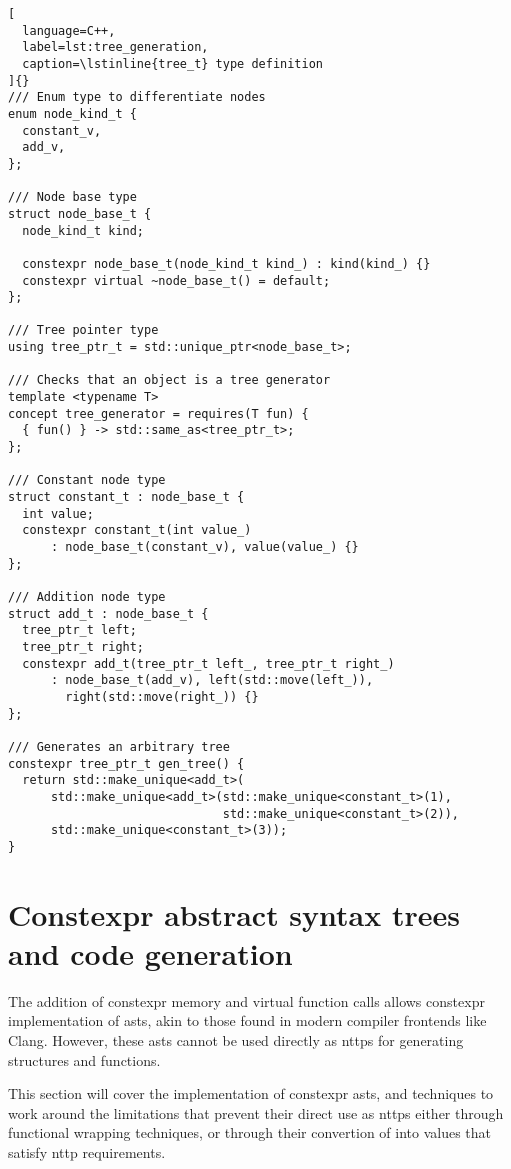 \documentclass[../main]{subfiles}
\begin{document}
\clearpage%

\begin{lstlisting}[
  language=C++,
  label=lst:tree_generation,
  caption=\lstinline{tree_t} type definition
]{}
/// Enum type to differentiate nodes
enum node_kind_t {
  constant_v,
  add_v,
};

/// Node base type
struct node_base_t {
  node_kind_t kind;

  constexpr node_base_t(node_kind_t kind_) : kind(kind_) {}
  constexpr virtual ~node_base_t() = default;
};

/// Tree pointer type
using tree_ptr_t = std::unique_ptr<node_base_t>;

/// Checks that an object is a tree generator
template <typename T>
concept tree_generator = requires(T fun) {
  { fun() } -> std::same_as<tree_ptr_t>;
};

/// Constant node type
struct constant_t : node_base_t {
  int value;
  constexpr constant_t(int value_)
      : node_base_t(constant_v), value(value_) {}
};

/// Addition node type
struct add_t : node_base_t {
  tree_ptr_t left;
  tree_ptr_t right;
  constexpr add_t(tree_ptr_t left_, tree_ptr_t right_)
      : node_base_t(add_v), left(std::move(left_)),
        right(std::move(right_)) {}
};

/// Generates an arbitrary tree
constexpr tree_ptr_t gen_tree() {
  return std::make_unique<add_t>(
      std::make_unique<add_t>(std::make_unique<constant_t>(1),
                              std::make_unique<constant_t>(2)),
      std::make_unique<constant_t>(3));
}
\end{lstlisting}

\clearpage%

\section{
  Constexpr abstract syntax trees and code generation
}
\label{lbl:ast-codegen}

The addition of \gls{constexpr} memory and virtual function calls allows
\gls{constexpr} implementation of \glspl{ast}, akin to those found
in modern \cpp compiler frontends like Clang.
However, these \glspl{ast} cannot be used directly as \glspl{nttp}
for generating structures and functions.

This section will cover the implementation of \gls{constexpr} \glspl{ast},
and techniques to work around the limitations that prevent their direct use as
\glspl{nttp} either through functional wrapping techniques, or through
their convertion of into values that satisfy \gls{nttp} requirements.
\end{document}
